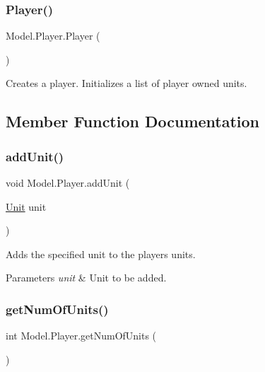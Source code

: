 \subsubsection{\texorpdfstring{Player()}{Player()}}
{\footnotesize\ttfamily Model.\+Player.\+Player (\begin{DoxyParamCaption}{ }\end{DoxyParamCaption})\hspace{0.3cm}{\ttfamily [inline]}}

Creates a player. Initializes a list of player owned units. 

\subsection{Member Function Documentation}
\hypertarget{class_model_1_1_player_a6eb0891c6c56bc41c87b3ebd4bbe3cb0}{}\label{class_model_1_1_player_a6eb0891c6c56bc41c87b3ebd4bbe3cb0} 
\subsubsection{\texorpdfstring{add\+Unit()}{addUnit()}}
{\footnotesize\ttfamily void Model.\+Player.\+add\+Unit (\begin{DoxyParamCaption}\item[{\hyperlink{interface_model_1_1_unit_module_1_1_unit}{Unit}}]{unit }\end{DoxyParamCaption})\hspace{0.3cm}{\ttfamily [inline]}}

Adds the specified unit to the player\textquotesingle{}s units. 
\begin{DoxyParams}{Parameters}
{\em unit} & Unit to be added. \\
\hline
\end{DoxyParams}
\hypertarget{class_model_1_1_player_ad128636680b101f6c4462d6630368a56}{}\label{class_model_1_1_player_ad128636680b101f6c4462d6630368a56} 
\subsubsection{\texorpdfstring{get\+Num\+Of\+Units()}{getNumOfUnits()}}
{\footnotesize\ttfamily int Model.\+Player.\+get\+Num\+Of\+Units (\begin{DoxyParamCaption}{ }\end{DoxyParamCaption})\hspace{0.3cm}{\ttfamily [inline]}}

